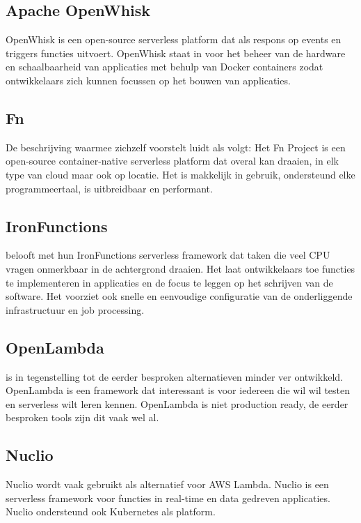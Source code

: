 \subsection{Apache OpenWhisk}
OpenWhisk is een open-source serverless platform dat als respons op events en triggers functies uitvoert. OpenWhisk staat in voor het beheer van de hardware en schaalbaarheid van applicaties met behulp van Docker containers zodat ontwikkelaars zich kunnen focussen op het bouwen van applicaties. \autocite{Apache2019}

\subsection{Fn}
De beschrijving waarmee \textcite{FnProject2019} zichzelf voorstelt luidt als volgt: Het Fn Project is een open-source container-native serverless platform dat overal kan draaien, in elk type van cloud maar ook op locatie. Het is makkelijk in gebruik, ondersteund elke programmeertaal, is uitbreidbaar en performant. 

\subsection{IronFunctions}
\textcite{Iron2018} belooft met hun IronFunctions serverless framework dat taken die veel CPU vragen onmerkbaar in de achtergrond draaien. Het laat ontwikkelaars toe functies te implementeren in applicaties en de focus te leggen op het schrijven van de software. Het voorziet ook snelle en eenvoudige configuratie van de onderliggende infrastructuur en job processing.

\subsection{OpenLambda}
\textcite{OpenLambda2019} is in tegenstelling tot de eerder besproken alternatieven minder ver ontwikkeld. OpenLambda is een framework dat interessant is voor iedereen die wil wil testen en serverless wilt leren kennen. OpenLambda is niet production ready, de eerder besproken tools zijn dit vaak wel al.

\subsection{Nuclio}
Nuclio wordt vaak gebruikt als alternatief voor AWS Lambda. Nuclio is een serverless framework voor functies in real-time en data gedreven applicaties. Nuclio ondersteund ook Kubernetes als platform. \autocite{Nuclio2019}

